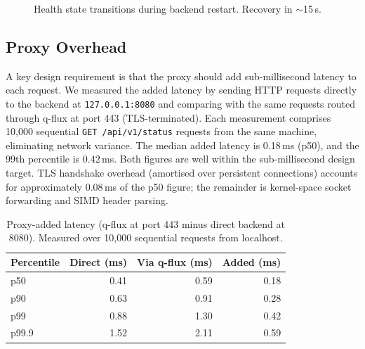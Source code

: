 \documentclass[a4paper, 11pt]{article}
\begin{document}
\begin{figure}[t]
\centering
{}
\caption{Health state transitions during backend restart. Recovery in $\sim$15\,s.}
\label{fig:health-recovery}
\end{figure}

\subsection{Proxy Overhead}
\label{sec:eval-overhead}

A key design requirement is that the proxy should add sub-millisecond
latency to each request. We measured the added latency by sending HTTP
requests directly to the backend at \texttt{127.0.0.1:8080} and
comparing with the same requests routed through q-flux at port 443
(TLS-terminated). Each measurement comprises 10{,}000 sequential
\texttt{GET /api/v1/status} requests from the same machine, eliminating
network variance. The median added latency is 0.18\,ms (p50), and the
99th percentile is 0.42\,ms.  Both figures are well within the
sub-millisecond design target. TLS handshake overhead (amortised over
persistent connections) accounts for approximately 0.08\,ms of the
p50 figure; the remainder is kernel-space socket forwarding and SIMD
header parsing.

\begin{table}[t]
\centering
\caption{Proxy-added latency (q-flux at port 443 minus direct backend at 8080).
Measured over 10{,}000 sequential requests from localhost.}
\label{tab:overhead}
\begin{tabular}{@{}lrrr@{}}
\toprule
\textbf{Percentile} & \textbf{Direct (ms)} & \textbf{Via q-flux (ms)} & \textbf{Added (ms)} \\
\midrule
p50  & 0.41 & 0.59 & 0.18 \\
p90  & 0.63 & 0.91 & 0.28 \\
p99  & 0.88 & 1.30 & 0.42 \\
p99.9 & 1.52 & 2.11 & 0.59 \\
\bottomrule
\end{tabular}
\end{table}
\end{document}
